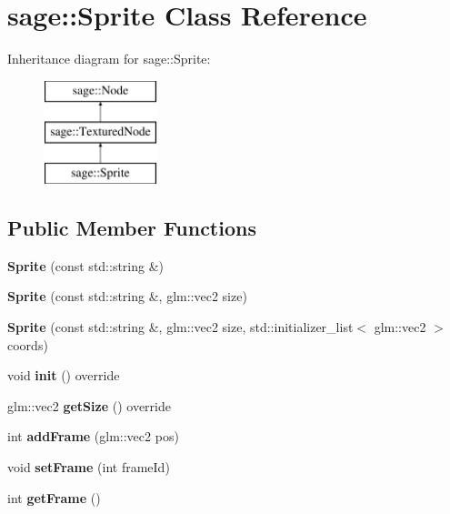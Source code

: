 \hypertarget{classsage_1_1Sprite}{}\section{sage\+::Sprite Class Reference}
\label{classsage_1_1Sprite}
Inheritance diagram for sage\+::Sprite\+:\begin{figure}[H]
\begin{center}
\leavevmode
\includegraphics[height=3.000000cm]{classsage_1_1Sprite}
\end{center}
\end{figure}
\subsection*{Public Member Functions}
\begin{DoxyCompactItemize}
\item 
\mbox{\label{classsage_1_1Sprite_abae47a15ec83a91f3b714db14f2a492b}} 
{\bfseries Sprite} (const std\+::string \&)
\item 
\mbox{\label{classsage_1_1Sprite_a76a269d903de2837314b42c3d43f0df2}} 
{\bfseries Sprite} (const std\+::string \&, glm\+::vec2 size)
\item 
\mbox{\label{classsage_1_1Sprite_a4ed2be3fab0b4869728be4f91cb67169}} 
{\bfseries Sprite} (const std\+::string \&, glm\+::vec2 size, std\+::initializer\+\_\+list$<$ glm\+::vec2 $>$ coords)
\item 
\mbox{\label{classsage_1_1Sprite_aeaf5c7aa5aeff1b0a4da9e66430f1c42}} 
void {\bfseries init} () override
\item 
\mbox{\label{classsage_1_1Sprite_ab6c3b12b45eeafab8e816207158121a1}} 
glm\+::vec2 {\bfseries get\+Size} () override
\item 
\mbox{\label{classsage_1_1Sprite_a7444391256eab0cf1b7a994885026352}} 
int {\bfseries add\+Frame} (glm\+::vec2 pos)
\item 
\mbox{\label{classsage_1_1Sprite_ada2cb241cf1fc71378372d04f19926e2}} 
void {\bfseries set\+Frame} (int frame\+Id)
\item 
\mbox{\label{classsage_1_1Sprite_af7d9465b0ef867d23cbb587b6c7b6b13}} 
int {\bfseries get\+Frame} ()
\end{DoxyCompactItemize}
